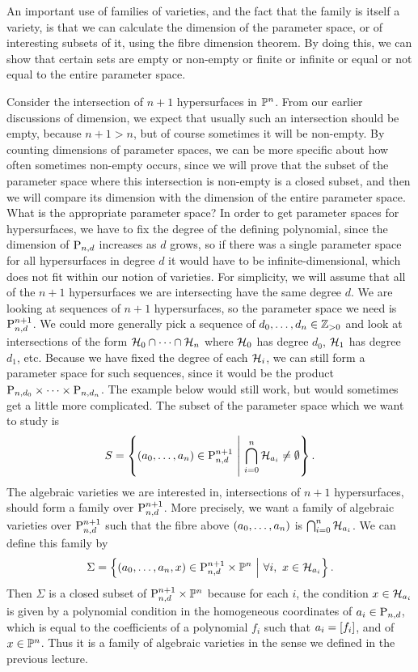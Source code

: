 An important use of families of varieties, and the fact that the family is itself a variety, is that we can calculate the dimension of the parameter space, or of interesting subsets of it, using the fibre dimension theorem. By doing this, we can show that certain sets are empty or non-empty or finite or infinite or equal or not equal to the entire parameter space.

\begin{example*}
Consider the intersection of $ n + 1 $ hypersurfaces in $ \PP^n $. From our earlier discussions of dimension, we expect that usually such an intersection should be empty, because $ n + 1 > n $, but of course sometimes it will be non-empty. By counting dimensions of parameter spaces, we can be more specific about how often sometimes non-empty occurs, since we will prove that the subset of the parameter space where this intersection is non-empty is a closed subset, and then we will compare its dimension with the dimension of the entire parameter space. What is the appropriate parameter space? In order to get parameter spaces for hypersurfaces, we have to fix the degree of the defining polynomial, since the dimension of $ \P_{n, d} $ increases as $ d $ grows, so if there was a single parameter space for all hypersurfaces in degree $ d $ it would have to be infinite-dimensional, which does not fit within our notion of varieties. For simplicity, we will assume that all of the $ n + 1 $ hypersurfaces we are intersecting have the same degree $ d $. We are looking at sequences of $ n + 1 $ hypersurfaces, so the parameter space we need is $ \P_{n, d}^{n + 1} $. We could more generally pick a sequence of $ d_0, \dots, d_n \in \ZZ_{> 0} $ and look at intersections of the form $ \HHH_0 \cap \dots \cap \HHH_n $ where $ \HHH_0 $ has degree $ d_0 $, $ \HHH_1 $ has degree $ d_1 $, etc. Because we have fixed the degree of each $ \HHH_i $, we can still form a parameter space for such sequences, since it would be the product $ \P_{n, d_0} \times \dots \times \P_{n, d_n} $. The example below would still work, but would sometimes get a little more complicated. The subset of the parameter space which we want to study is
$$ S = \cbr{\br{a_0, \dots, a_n} \in \P_{n, d}^{n + 1} \st \bigcap_{i = 0}^n \HHH_{a_i} \ne \emptyset}. $$
The algebraic varieties we are interested in, intersections of $ n + 1 $ hypersurfaces, should form a family over $ \P_{n, d}^{n + 1} $. More precisely, we want a family of algebraic varieties over $ \P_{n, d}^{n + 1} $ such that the fibre above $ \br{a_0, \dots, a_n} $ is $ \bigcap_{i = 0}^n \HHH_{a_i} $. We can define this family by
$$ \Sigma = \cbr{\br{a_0, \dots, a_n, x} \in \P_{n, d}^{n + 1} \times \PP^n \st \forall i, \ x \in \HHH_{a_i}}. $$
Then $ \Sigma $ is a closed subset of $ \P_{n, d}^{n + 1} \times \PP^n $ because for each $ i $, the condition $ x \in \HHH_{a_i} $ is given by a polynomial condition in the homogeneous coordinates of $ a_i \in \P_{n, d} $, which is equal to the coefficients of a polynomial $ f_i $ such that $ a_i = \sbr{f_i} $, and of $ x \in \PP^n $. Thus it is a family of algebraic varieties in the sense we defined in the previous lecture.


\end{example*}
